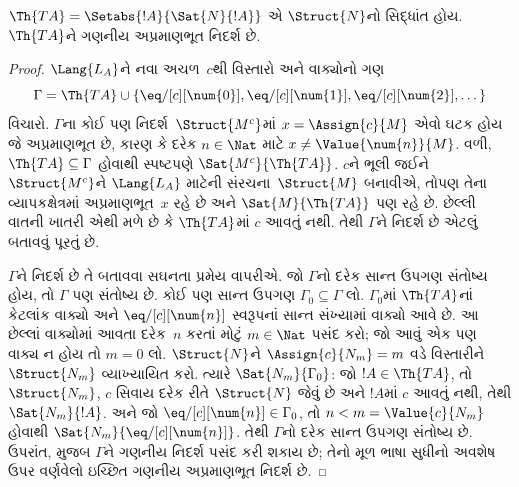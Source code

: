 \begin{prop}
$\Th{TA}=\Setabs{!A}{\Sat{N}{!A}}$ એ $\Struct{N}$નો સિદ્ધાંત હોય.
$\Th{TA}$ને ગણનીય અપ્રમાણભૂત નિદર્શ છે.
\end{prop}

\begin{proof}
$\Lang{L_A}$ને નવા અચળ~$c$થી વિસ્તારો અને વાક્યોનો ગણ
\[
\Gamma=\Th{TA}\cup\{\eq/[c][\num{0}],\eq/[c][\num{1}],
\eq/[c][\num{2}],\dots\}
\]
વિચારો. $\Gamma$ના કોઈ પણ નિદર્શ~$\Struct{M^c}$માં
$x=\Assign{c}{M}$ એવો ઘટક હોય જે અપ્રમાણભૂત છે, કારણ કે
દરેક $n\in\Nat$ માટે $x\neq\Value{\num{n}}{M}$. વળી,
$\Th{TA}\subseteq\Gamma$ હોવાથી સ્પષ્ટપણે
$\Sat{M^c}{\Th{TA}}$. $c$ને ભૂલી જઈને $\Struct{M^c}$ને
$\Lang{L_A}$ માટેની સંરચના~$\Struct{M}$ બનાવીએ, તોપણ તેના
વ્યાપકક્ષેત્રમાં અપ્રમાણભૂત~$x$ રહે છે અને
$\Sat{M}{\Th{TA}}$ પણ રહે છે. છેલ્લી વાતની ખાતરી એથી મળે છે કે
$\Th{TA}$માં $c$ આવતું નથી. તેથી $\Gamma$ને નિદર્શ છે એટલું બતાવવું
પૂરતું છે.

$\Gamma$ને નિદર્શ છે તે બતાવવા સઘનતા પ્રમેય વાપરીએ. જો $\Gamma$નો
દરેક સાન્ત ઉપગણ સંતોષ્ય હોય, તો $\Gamma$ પણ સંતોષ્ય છે. કોઈ પણ સાન્ત
ઉપગણ $\Gamma_0\subseteq\Gamma$ લો. $\Gamma_0$માં $\Th{TA}$નાં કેટલાંક
વાક્યો અને $\eq/[c][\num{n}]$ સ્વરૂપનાં સાન્ત સંખ્યામાં વાક્યો
આવે છે. આ છેલ્લાં વાક્યોમાં આવતા દરેક~$n$ કરતાં મોટું $m\in\Nat$
પસંદ કરો; જો આવું એક પણ વાક્ય ન હોય તો $m=0$ લો. $\Struct{N}$ને
$\Assign{c}{N_m}=m$ વડે વિસ્તારીને $\Struct{N_m}$ વ્યાખ્યાયિત કરો.
ત્યારે $\Sat{N_m}{\Gamma_0}$: જો $!A\in\Th{TA}$, તો $\Struct{N_m}$,
$c$ સિવાય દરેક રીતે $\Struct{N}$ જેવું છે અને $!A$માં $c$ આવતું નથી,
તેથી $\Sat{N_m}{!A}$. અને જો
$\eq/[c][\num{n}]\in\Gamma_0$, તો $n<m=\Value{c}{N_m}$ હોવાથી
$\Sat{N_m}{\eq/[c][\num{n}]}$. તેથી $\Gamma$નો દરેક સાન્ત ઉપગણ
સંતોષ્ય છે. ઉપરાંત,  મુજબ $\Gamma$ને
ગણનીય નિદર્શ પસંદ કરી શકાય છે; તેનો મૂળ ભાષા સુધીનો અવશેષ
ઉપર વર્ણવેલો ઇચ્છિત ગણનીય અપ્રમાણભૂત નિદર્શ છે.
\end{proof}
\endgroup


